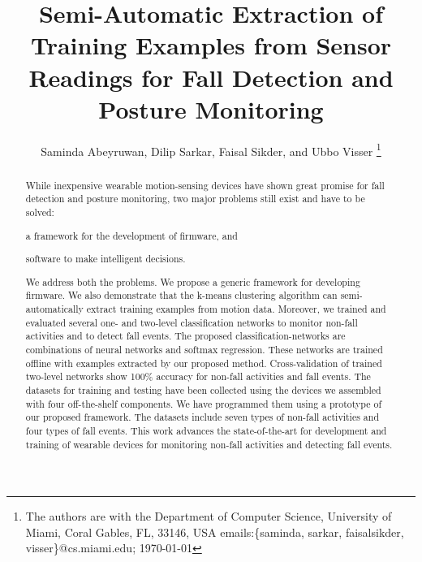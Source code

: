 \documentclass[]{IEEEtran}
\title{Semi-Automatic Extraction of Training Examples from Sensor Readings for Fall Detection and Posture Monitoring}
\author{{Saminda Abeyruwan}, {Dilip Sarkar}, {Faisal Sikder}, and {Ubbo Visser}
\thanks{The authors are with the Department of Computer Science, University of Miami,
  Coral Gables, FL, 33146, USA
{ emails:\{saminda, sarkar, faisalsikder, visser\}@cs.miami.edu};
\today} }
\begin{document}
\maketitle
\IEEEpeerreviewmaketitle

\begin{abstract}
While inexpensive wearable motion-sensing devices have shown great promise for fall detection and posture monitoring,  two major problems still exist and have to be solved: \begin{inparaenum}  \item a framework for the development of firmware, and \item software to make intelligent decisions. \end{inparaenum} We address both the problems.  
We propose a generic framework for developing firmware. We also demonstrate that the k-means clustering algorithm can semi-automatically extract training examples from motion data. 
Moreover, we trained and evaluated several one- and two-level classification networks to monitor 
non-fall activities and to detect fall events.
The proposed classification-networks are combinations of neural  networks
and softmax regression. 
These networks are trained offline with examples extracted  by our proposed method. Cross-validation of trained two-level networks show 100\% accuracy for non-fall activities and fall events. The datasets for training and testing have been collected using the devices we assembled with four off-the-shelf components. We have programmed them using a prototype of our proposed framework. The datasets include seven types of non-fall activities and four types of fall events.
This work advances the state-of-the-art for development and training of wearable devices for monitoring non-fall activities and detecting fall events.
%
%
%

\end{abstract}
\end{document}
